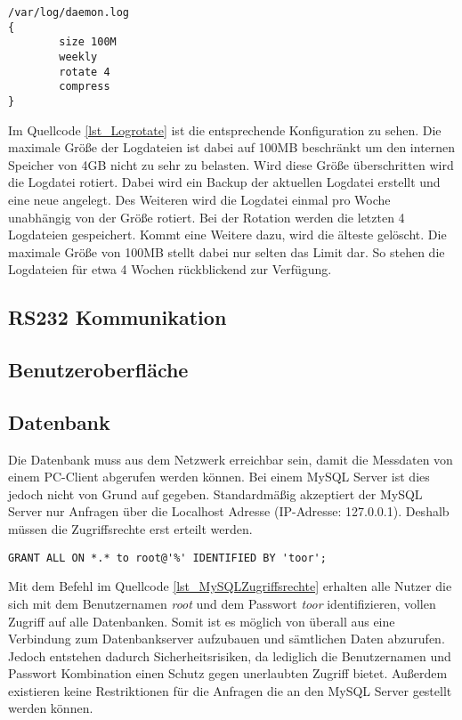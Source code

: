 \begin{lstlisting}[caption={Logrotate},label=lst_Logrotate]
/var/log/daemon.log
{
        size 100M
        weekly
        rotate 4
        compress
}
\end{lstlisting}

Im Quellcode \ref{lst_Logrotate} ist die entsprechende Konfiguration zu sehen. Die maximale Größe der Logdateien ist dabei auf 100MB beschränkt um den internen Speicher von 4GB nicht zu sehr zu belasten. Wird diese Größe überschritten wird die Logdatei rotiert. Dabei wird ein Backup der aktuellen Logdatei erstellt und eine neue angelegt. Des Weiteren wird die Logdatei einmal pro Woche unabhängig von der Größe rotiert. Bei der Rotation werden die letzten 4 Logdateien gespeichert. Kommt eine Weitere dazu, wird die älteste gelöscht. Die maximale Größe von 100MB stellt dabei nur selten das Limit dar. So stehen die Logdateien für etwa 4 Wochen rückblickend zur Verfügung.



\subsection{RS232 Kommunikation}


\subsection{Benutzeroberfläche}


\subsection{Datenbank}

Die Datenbank muss aus dem Netzwerk erreichbar sein, damit die Messdaten von einem PC-Client abgerufen werden können. Bei einem MySQL Server ist dies jedoch nicht von Grund auf gegeben. Standardmäßig akzeptiert der MySQL Server nur Anfragen über die Localhost Adresse (IP-Adresse: 127.0.0.1). Deshalb müssen die Zugriffsrechte erst erteilt werden.\\

\begin{lstlisting}[caption={MySQL Zugriffsrechte},label=lst_MySQLZugriffsrechte]
GRANT ALL ON *.* to root@'%' IDENTIFIED BY 'toor';
\end{lstlisting}

Mit dem Befehl im Quellcode \ref{lst_MySQLZugriffsrechte} erhalten alle Nutzer die sich mit dem Benutzernamen \textit{root} und dem Passwort \textit{toor} identifizieren, vollen Zugriff auf alle Datenbanken. Somit ist es möglich von überall aus eine Verbindung zum Datenbankserver aufzubauen und sämtlichen Daten abzurufen.\\
Jedoch entstehen dadurch Sicherheitsrisiken, da lediglich die Benutzernamen und Passwort Kombination einen Schutz gegen unerlaubten Zugriff bietet. Außerdem existieren keine Restriktionen für die Anfragen die an den MySQL Server gestellt werden können.\\


